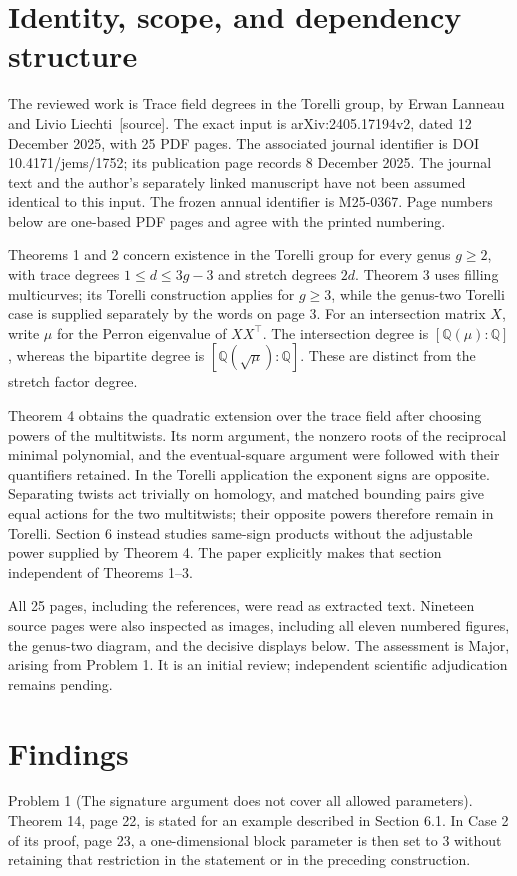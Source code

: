 \documentclass[10pt]{article}
\begin{document}
\section*{Identity, scope, and dependency structure}
The reviewed work is Trace field degrees in the Torelli group, by Erwan Lanneau and Livio Liechti [source]. The exact input is arXiv:2405.17194v2, dated 12 December 2025, with 25 PDF pages. The associated journal identifier is DOI 10.4171/jems/1752; its publication page records 8 December 2025. The journal text and the author’s separately linked manuscript have not been assumed identical to this input. The frozen annual identifier is M25-0367. Page numbers below are one-based PDF pages and agree with the printed numbering.\par
Theorems 1 and 2 concern existence in the Torelli group for every genus \(g\geq2\), with trace degrees \(1\leq d\leq3g-3\) and stretch degrees \(2d\). Theorem 3 uses filling multicurves; its Torelli construction applies for \(g\geq3\), while the genus-two Torelli case is supplied separately by the words on page 3. For an intersection matrix \(X\), write \(\mu\) for the Perron eigenvalue of \(XX^\top\). The intersection degree is \([\mathbb Q(\mu):\mathbb Q]\), whereas the bipartite degree is \([\mathbb Q(\sqrt\mu):\mathbb Q]\). These are distinct from the stretch factor degree.\par
Theorem 4 obtains the quadratic extension over the trace field after choosing powers of the multitwists. Its norm argument, the nonzero roots of the reciprocal minimal polynomial, and the eventual-square argument were followed with their quantifiers retained. In the Torelli application the exponent signs are opposite. Separating twists act trivially on homology, and matched bounding pairs give equal actions for the two multitwists; their opposite powers therefore remain in Torelli. Section 6 instead studies same-sign products without the adjustable power supplied by Theorem 4. The paper explicitly makes that section independent of Theorems 1–3.\par
All 25 pages, including the references, were read as extracted text. Nineteen source pages were also inspected as images, including all eleven numbered figures, the genus-two diagram, and the decisive displays below. The assessment is Major, arising from Problem 1. It is an initial review; independent scientific adjudication remains pending.\par
\section*{Findings}
Problem 1 (The signature argument does not cover all allowed parameters).  Theorem 14, page 22, is stated for an example described in Section 6.1. In Case 2 of its proof, page 23, a one-dimensional block parameter is then set to \(3\) without retaining that restriction in the statement or in the preceding construction.\par
\end{document}
